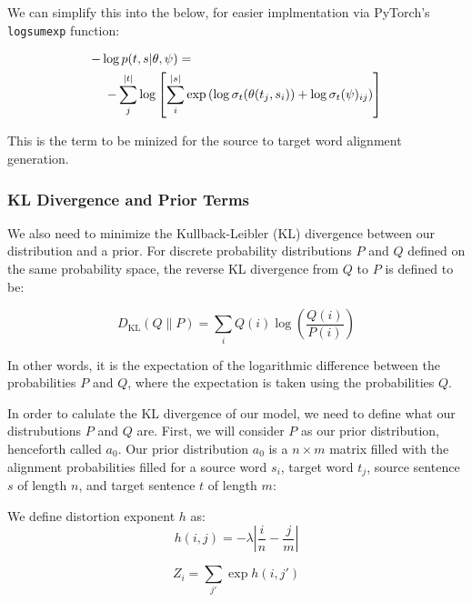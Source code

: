\documentclass[twoside,twocolumn]{article}
\begin{document}
We can simplify this into the below, for easier implmentation via PyTorch's \texttt{logsumexp} function:

\begin{equation}
  \centering
  \begin{split}
  -\log  p(t & , s | \theta, \psi) = \\
  - \sum_j^{|t|} & \log \left[ \sum_i^{|s|} \exp \left( \log \sigma_t(\theta(t_j, s_i)) + \log \sigma_t(\psi)_{ij} \right) \right]
\end{split}
\end{equation}

This is the term to be minized for the source to target word alignment generation.

\subsubsection{KL Divergence and Prior Terms}

We also need to minimize the Kullback-Leibler (KL) divergence between our distribution and a prior. For discrete probability distributions $P$ and $Q$ defined on the same probability space, the reverse KL divergence from $Q$ to $P$ is defined to be:

\begin{equation}
D _ { \mathrm { KL } } ( Q \| P ) = \sum _ { i } Q ( i ) \log \left( \frac { Q ( i ) } { P ( i ) } \right)
\end{equation}

In other words, it is the expectation of the logarithmic difference between the probabilities $P$ and $Q$, where the expectation is taken using the probabilities $Q$.

In order to calulate the KL divergence of our model, we need to define what our distrubutions $P$ and $Q$ are. First, we will consider $P$ as our prior distribution, henceforth called $a_0$. Our prior distribution $a_0$ is a $n \times m$ matrix filled with the alignment probabilities filled for a source word $s_i$, target word $t_j$, source sentence $s$ of length $n$, and target sentence $t$ of length $m$:

We define distortion exponent $h$ as:
\begin{equation}
  h(i, j) = {-\lambda \left| \frac{i}{n} - \frac{j}{m}\right|}
\end{equation}

\begin{equation}
  Z_i = \sum_{j'} \exp h(i, j')
\end{equation}
\end{document}
